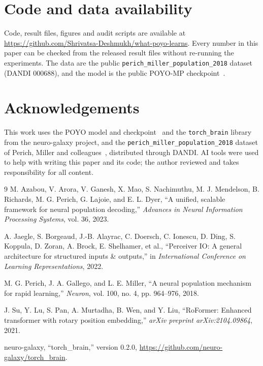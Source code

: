 \documentclass[11pt]{article}
\begin{document}
\section*{Code and data availability}

Code, result files, figures and audit scripts are available at \url{https://github.com/Shrivatsa-Deshmukh/what-poyo-learns}. Every number in this paper can be checked from the released result files without re-running the experiments. The data are the public \texttt{perich\_miller\_population\_2018} dataset~\cite{ref3} (DANDI 000688), and the model is the public POYO-MP checkpoint~\cite{ref1}.

\section*{Acknowledgements}

This work uses the POYO model and checkpoint~\cite{ref1} and the \texttt{torch\_brain} library~\cite{ref5} from the neuro-galaxy project, and the \texttt{perich\_miller\_population\_2018} dataset of Perich, Miller and colleagues~\cite{ref3}, distributed through DANDI. AI tools were used to help with writing this paper and its code; the author reviewed and takes responsibility for all content.

\begin{thebibliography}{9}
 M. Azabou, V. Arora, V. Ganesh, X. Mao, S. Nachimuthu, M. J. Mendelson, B. Richards, M. G. Perich, G. Lajoie, and E. L. Dyer, ``A unified, scalable framework for neural population decoding,'' \emph{Advances in Neural Information Processing Systems}, vol. 36, 2023.

 A. Jaegle, S. Borgeaud, J.-B. Alayrac, C. Doersch, C. Ionescu, D. Ding, S. Koppula, D. Zoran, A. Brock, E. Shelhamer, et al., ``Perceiver IO: A general architecture for structured inputs \& outputs,'' in \emph{International Conference on Learning Representations}, 2022.

 M. G. Perich, J. A. Gallego, and L. E. Miller, ``A neural population mechanism for rapid learning,'' \emph{Neuron}, vol. 100, no. 4, pp. 964--976, 2018.

 J. Su, Y. Lu, S. Pan, A. Murtadha, B. Wen, and Y. Liu, ``RoFormer: Enhanced transformer with rotary position embedding,'' \emph{arXiv preprint arXiv:2104.09864}, 2021.

 neuro-galaxy, ``torch\_brain,'' version 0.2.0, \url{https://github.com/neuro-galaxy/torch_brain}.
\end{thebibliography}
\end{document}
